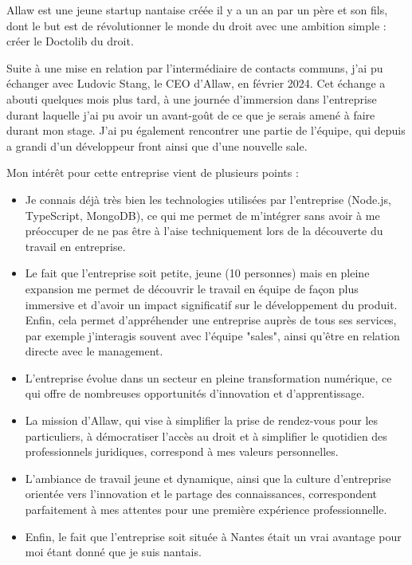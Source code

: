 Allaw est une jeune startup nantaise créée il y a un an par un père et son fils,
dont le but est de révolutionner le monde du droit avec une ambition simple :
créer le Doctolib du droit.

Suite à une mise en relation par l'intermédiaire de contacts communs, j'ai
pu échanger avec Ludovic Stang, le CEO d'Allaw, en février 2024. Cet échange
a abouti quelques mois plus tard, à une journée d'immersion dans l'entreprise
durant laquelle j'ai pu avoir un avant-goût de ce que je serais amené à faire
durant mon stage. J'ai pu également rencontrer une partie de l'équipe, qui
depuis a grandi d'un développeur front ainsi que d'une nouvelle sale.

Mon intérêt pour cette entreprise vient de plusieurs points :
\begin{itemize}
  \item Je connais déjà très bien les technologies utilisées par l'entreprise
        (Node.js, TypeScript, MongoDB),
        ce qui me permet de m'intégrer sans avoir à me préoccuper de ne pas
        être à l'aise techniquement lors de la découverte du travail en entreprise.

  \item Le fait que l'entreprise soit petite, jeune (10 personnes) mais en pleine
        expansion me permet de découvrir le travail en équipe de façon plus immersive
        et d'avoir un impact significatif sur le développement du produit. Enfin, cela
        permet d'appréhender une entreprise auprès de tous ses services, par exemple
        j'interagis souvent avec l'équipe "sales", ainsi qu'être en relation directe
        avec le management.

  \item L'entreprise évolue dans un secteur en pleine transformation numérique,
        ce qui offre de nombreuses opportunités d'innovation et d'apprentissage.

  \item La mission d'Allaw, qui vise à simplifier la prise de rendez-vous pour les
        particuliers, à démocratiser l'accès au droit et à simplifier le quotidien des
        professionnels juridiques, correspond à mes valeurs personnelles.

  \item L'ambiance de travail jeune et dynamique, ainsi que la culture d'entreprise
        orientée vers l'innovation et le partage des connaissances, correspondent
        parfaitement à mes attentes pour une première expérience professionnelle.

  \item Enfin, le fait que l'entreprise soit située à Nantes était un vrai
        avantage pour moi étant donné que je suis nantais.
\end{itemize}

